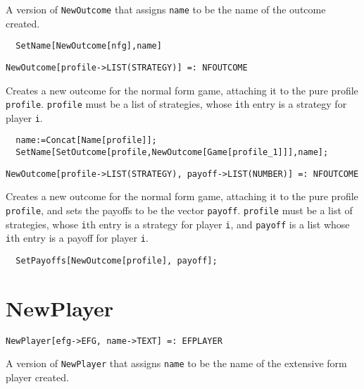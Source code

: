\noindent
A version of \verb+NewOutcome+ that assigns \verb+name+ to be the name
of the outcome created.  

\udfbody
\begin{verbatim}
  SetName[NewOutcome[nfg],name]
\end{verbatim} 

\newsignature

\begin{verbatim}
NewOutcome[profile->LIST(STRATEGY)] =: NFOUTCOME 
\end{verbatim}

\noindent
Creates a new outcome for the normal form game, attaching it to
the pure profile \verb+profile+.  \verb+profile+ must be a list of
strategies, whose \verb+i+th entry is a strategy for player \verb+i+. 

\udfbody
\begin{verbatim}
  name:=Concat[Name[profile]];
  SetName[SetOutcome[profile,NewOutcome[Game[profile_1]]],name];
\end{verbatim} 

\newsignature

\begin{verbatim}
NewOutcome[profile->LIST(STRATEGY), payoff->LIST(NUMBER)] =: NFOUTCOME 
\end{verbatim}
 
\noindent
Creates a new outcome for the normal form game, attaching it to
the pure profile \verb+profile+, and sets the payoffs to be the vector
\verb+payoff+.  \verb+profile+ must be a list of strategies, whose
\verb+i+th entry is a strategy for player \verb+i+, and \verb+payoff+
is a list whose \verb+i+th entry is a payoff for player \verb+i+.

\udfbody
\begin{verbatim}
  SetPayoffs[NewOutcome[profile], payoff];
\end{verbatim} 


\section*{NewPlayer}\label{ExtNewPlayer}
\begin{verbatim}
NewPlayer[efg->EFG, name->TEXT] =: EFPLAYER 
\end{verbatim}

\noindent
A version of \verb+NewPlayer+ that assigns \verb+name+ to be the name
of the extensive form player created.  

